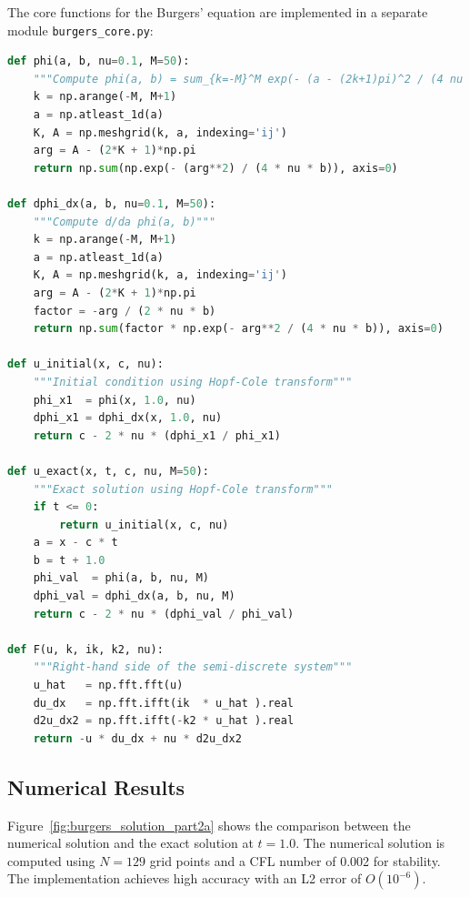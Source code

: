\documentclass{article}
\begin{document}
The core functions for the Burgers' equation are implemented in a separate module \texttt{burgers\_core.py}:

\begin{lstlisting}[language=Python]
def phi(a, b, nu=0.1, M=50):
    """Compute phi(a, b) = sum_{k=-M}^M exp(- (a - (2k+1)pi)^2 / (4 nu b))"""
    k = np.arange(-M, M+1)
    a = np.atleast_1d(a)
    K, A = np.meshgrid(k, a, indexing='ij')
    arg = A - (2*K + 1)*np.pi
    return np.sum(np.exp(- (arg**2) / (4 * nu * b)), axis=0)

def dphi_dx(a, b, nu=0.1, M=50):
    """Compute d/da phi(a, b)"""
    k = np.arange(-M, M+1)
    a = np.atleast_1d(a)
    K, A = np.meshgrid(k, a, indexing='ij')
    arg = A - (2*K + 1)*np.pi
    factor = -arg / (2 * nu * b)
    return np.sum(factor * np.exp(- arg**2 / (4 * nu * b)), axis=0)

def u_initial(x, c, nu):
    """Initial condition using Hopf-Cole transform"""
    phi_x1  = phi(x, 1.0, nu)
    dphi_x1 = dphi_dx(x, 1.0, nu)
    return c - 2 * nu * (dphi_x1 / phi_x1)

def u_exact(x, t, c, nu, M=50):
    """Exact solution using Hopf-Cole transform"""
    if t <= 0:
        return u_initial(x, c, nu)
    a = x - c * t
    b = t + 1.0
    phi_val  = phi(a, b, nu, M)
    dphi_val = dphi_dx(a, b, nu, M)
    return c - 2 * nu * (dphi_val / phi_val)

def F(u, k, ik, k2, nu):
    """Right-hand side of the semi-discrete system"""
    u_hat   = np.fft.fft(u)
    du_dx   = np.fft.ifft(ik  * u_hat ).real
    d2u_dx2 = np.fft.ifft(-k2 * u_hat ).real
    return -u * du_dx + nu * d2u_dx2
\end{lstlisting}

\subsection*{Numerical Results}
Figure~\ref{fig:burgers_solution_part2a} shows the comparison between the numerical solution and the exact solution at $t=1.0$. The numerical solution is computed using $N=129$ grid points and a CFL number of 0.002 for stability. The implementation achieves high accuracy with an L2 error of $O(10^{-6})$.
\end{document}

